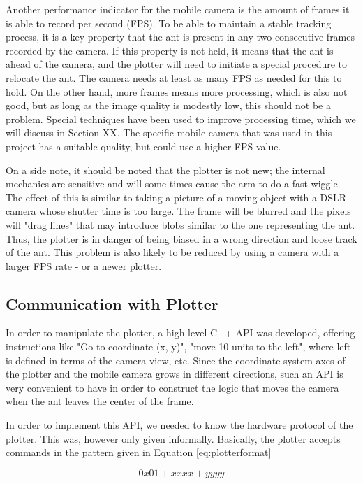 Another performance indicator for the mobile camera is the amount of frames it is able to record per second (FPS). To be able to maintain a stable tracking process, it is a key property that the ant is present in any two consecutive frames recorded by the camera. If this property is not held, it means that the ant is ahead of the camera, and the plotter will need to initiate a special procedure to relocate the ant. The camera needs at least as many FPS as needed for this to hold. On the other hand, more frames means more processing, which is also not good, but as long as the image quality is modestly low, this should not be a problem. Special techniques have been used to improve processing time, which we will discuss in Section XX. The specific mobile camera that was used in this project has a suitable quality, but could use a higher FPS value.

On a side note, it should be noted that the plotter is not new; the internal mechanics are sensitive and will some times cause the arm to do a fast wiggle. The effect of this is similar to taking a picture of a moving object with a DSLR camera whose shutter time is too large. The frame will be blurred and the pixels will "drag lines" that may introduce blobs similar to the one representing the ant. Thus, the plotter is in danger of being biased in a wrong direction and loose track of the ant. This problem is also likely to be reduced by using a camera with a larger FPS rate - or a newer plotter.

\subsection{Communication with Plotter}
In order to manipulate the plotter, a high level C++ API was developed, offering instructions like "Go to coordinate (x, y)", "move 10 units to the left", where left is defined in terms of the camera view, etc. Since the coordinate system axes of the plotter and the mobile camera grows in different directions, such an API is very convenient to have in order to construct the logic that moves the camera when the ant leaves the center of the frame.

In order to implement this API, we needed to know the hardware protocol of the plotter. This was, however only given informally. Basically, the plotter accepts commands in the pattern given in Equation \ref{eq:plotterformat}

\begin{center}
  \begin{equation}
  \label{eq:plotterformat}
    0x01 +  xxxx +  yyyy
  \end{equation}
\end{center}

